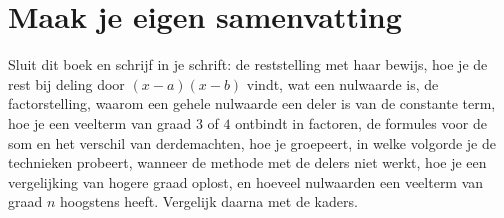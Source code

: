 \begin{oefeningen}










\end{oefeningen}


\ifzelfstudie
\section*{Maak je eigen samenvatting}
Sluit dit boek en schrijf in je schrift: de reststelling met haar bewijs, hoe je de rest bij deling door $(x - a)(x - b)$ vindt, wat een nulwaarde is, de factorstelling, waarom een gehele nulwaarde een deler is van de constante term, hoe je een veelterm van graad $3$ of $4$ ontbindt in factoren, de formules voor de som en het verschil van derdemachten, hoe je groepeert, in welke volgorde je de technieken probeert, wanneer de methode met de delers niet werkt, hoe je een vergelijking van hogere graad oplost, en hoeveel nulwaarden een veelterm van graad $n$ hoogstens heeft. Vergelijk daarna met de kaders.
\fi
